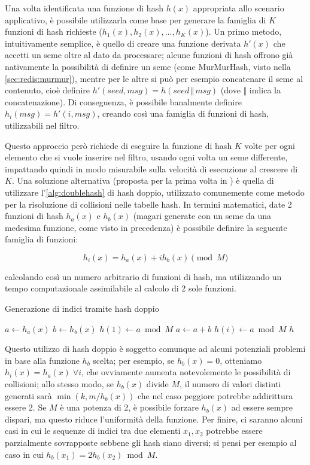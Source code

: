Una volta identificata una funzione di hash $h(x)$ appropriata allo scenario applicativo, è
possibile utilizzarla come base per generare la famiglia di $K$ funzioni di hash richieste ($h_1(x),
h_2(x), \dots, h_K(x)$). Un primo metodo, intuitivamente semplice, è quello di creare una funzione
derivata $h'(x)$ che accetti un seme oltre al dato da processare; alcune funzioni di hash offrono
già nativamente la possibilità di definire un seme (come MurMurHash, visto nella
\autoref{sec:redis:murmur}), mentre per le altre si può per esempio concatenare il seme al
contenuto, cioè definire $h'(seed, msg) = h(seed\,\Vert\,msg)$ (dove $\Vert$ indica la
concatenazione). Di conseguenza, è possibile banalmente definire $h_i(msg) = h'(i, msg)$, creando
così una famiglia di funzioni di hash, utilizzabili nel filtro.

Questo approccio però richiede di eseguire la funzione di hash $K$ volte per ogni elemento che si
vuole inserire nel filtro, usando ogni volta un seme differente, impattando quindi in modo
misurabile sulla velocità di esecuzione al crescere di $K$. Una soluzione alternativa (proposta per
la prima volta in \cite{bloom-doublehash}) è quella di utilizzare l'\autoref{alg:doublehash} di hash
doppio, utilizzato comunemente come metodo per la risoluzione di collisioni nelle tabelle hash. In
termini matematici, date 2 funzioni di hash $h_a(x)$ e $h_b(x)$ (magari generate con un seme da una
medesima funzione, come visto in precedenza) è possibile definire la seguente famiglia di funzioni:

$$ h_i(x) = h_a(x) + ih_b(x) \pmod M $$ 

calcolando così un numero arbitrario di funzioni di hash, ma utilizzando un tempo computazionale
assimilabile al calcolo di 2 sole funzioni.

\begin{algorithm}
\caption{Generazione di indici tramite hash doppio}
\label{alg:doublehash}
\begin{algorithmic}[1]
	\State $a \gets h_a(x)$
	\State $b \gets h_b(x)$
	\State $h(1) \gets a \bmod M$
		\State $a \gets a+b$
		\State $h(i) \gets a \bmod M$
	\EndFor
	\State \Return $h$
\EndProcedure
\end{algorithmic}
\end{algorithm}

Questo utilizzo di hash doppio è soggetto comunque ad alcuni potenziali problemi in base alla
funzione $h_b$ scelta; per esempio, se $h_b(x) = 0$, otteniamo $h_i(x) = h_a(x) \; \forall i$, che
ovviamente aumenta notevolemente le possibilità di collisioni; allo stesso modo, se $h_b(x)$ divide
$M$, il numero di valori distinti generati sarà $\min(k, m/h_b(x))$ che nel caso peggiore potrebbe
addirittura essere \num{2}. Se $M$ è una potenza di \num{2}, è possibile forzare $h_b(x)$ ad essere
sempre dispari, ma questo riduce l'uniformità della funzione. Per finire, ci saranno alcuni casi in
cui le sequenze di indici tra due elementi $x_1, x_2$ potrebbe essere parzialmente sovrapposte
sebbene gli hash siano diversi; si pensi per esempio al caso in cui $h_b(x_1) = 2h_b(x_2) \bmod M$.

